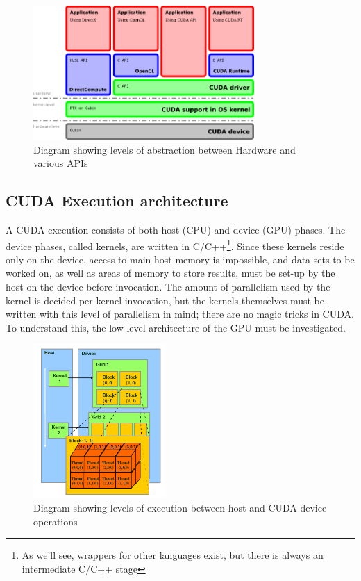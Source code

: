\begin{figure}[h!]
\centering
  \includegraphics[width=0.75\textwidth,keepaspectratio=true]{images/cuda_architecture.png}
  \caption{Diagram showing levels of abstraction between Hardware and various APIs}
  \label{fig:CUDAArch}
\end{figure}

\subsection{CUDA Execution architecture}\label{fig:CUDAExecArch}
A CUDA execution consists of both host (CPU) and device (GPU) phases. The device phases, called kernels, are written in C/C++\footnote{As we'll see, wrappers for other languages exist, but there is always an intermediate C/C++ stage}. Since these kernels reside only on the device, access to main host memory is impossible, and data sets to be worked on, as well as areas of memory to store results, must be set-up by the host on the device before invocation. The amount of parallelism used by the kernel is decided per-kernel invocation, but the kernels themselves must be written with this level of parallelism in mind; there are no magic tricks in CUDA. To understand this, the low level architecture of the GPU must be investigated. 

\begin{figure}[h!]
  \centering
  \includegraphics[width=0.45\textwidth,keepaspectratio=true]{images/CUDA_host_dev_threads.png}
  \caption{Diagram showing levels of execution between host and CUDA device operations}
  \label{fig:CUDAHostDevExec}
\end{figure}

